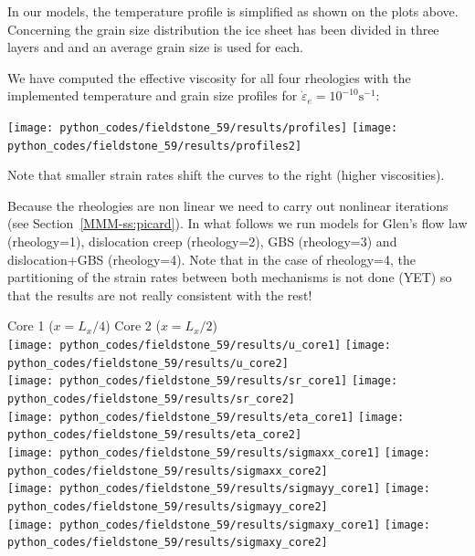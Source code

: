 In our models, the temperature profile is simplified 
as shown on the plots above. 
Concerning the grain size distribution the ice sheet has been divided in three 
layers and and an average grain size is used for each.

We have computed the effective viscosity for all four rheologies with the 
implemented temperature and grain size profiles for $\dot{\varepsilon}_e=10^{-10}\text{s}^{-1}$:

\begin{center}
\texttt{[image: python\_codes/fieldstone\_59/results/profiles]}
\texttt{[image: python\_codes/fieldstone\_59/results/profiles2]}
\end{center}
Note that smaller strain rates shift the curves to the right (higher viscosities).



Because the rheologies are non linear we need to carry out nonlinear iterations 
(see Section~\ref{MMM-ss:picard}).
In what follows we run models for Glen's flow law (rheology=1), 
dislocation creep (rheology=2), GBS (rheology=3) and dislocation+GBS (rheology=4).
Note that in the case of rheology=4, the partitioning of the strain rates between both 
mechanisms is not done (YET) so that the results are not really consistent with the rest!

\begin{center}
Core 1 ($x=L_x/4$) \hspace{5cm}  Core 2 ($x=L_x/2$)  \\
\texttt{[image: python\_codes/fieldstone\_59/results/u\_core1]}
\texttt{[image: python\_codes/fieldstone\_59/results/u\_core2]}\\
\texttt{[image: python\_codes/fieldstone\_59/results/sr\_core1]}
\texttt{[image: python\_codes/fieldstone\_59/results/sr\_core2]}\\
\texttt{[image: python\_codes/fieldstone\_59/results/eta\_core1]}
\texttt{[image: python\_codes/fieldstone\_59/results/eta\_core2]}\\
\texttt{[image: python\_codes/fieldstone\_59/results/sigmaxx\_core1]}
\texttt{[image: python\_codes/fieldstone\_59/results/sigmaxx\_core2]}\\
\texttt{[image: python\_codes/fieldstone\_59/results/sigmayy\_core1]}
\texttt{[image: python\_codes/fieldstone\_59/results/sigmayy\_core2]}\\
\texttt{[image: python\_codes/fieldstone\_59/results/sigmaxy\_core1]}
\texttt{[image: python\_codes/fieldstone\_59/results/sigmaxy\_core2]}
\end{center}


